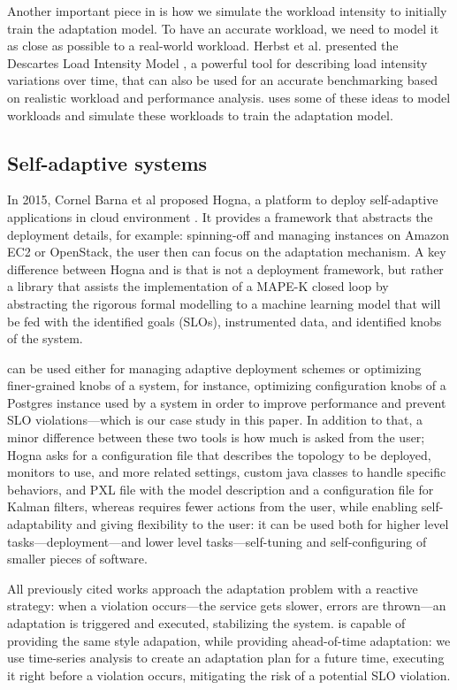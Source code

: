 Another important piece in \projectname{} is how we simulate the workload intensity to initially train the adaptation model. To have an accurate workload, we need to model it as close as possible to a real-world workload. Herbst et al. presented the Descartes Load Intensity Model \cite{kistowski_modeling_2017}, a powerful tool for describing load intensity variations over time, that can also be used for an accurate benchmarking based on realistic workload and performance analysis. \projectname{} uses some of these ideas to model workloads and simulate these workloads to train the adaptation model.

\subsection{Self-adaptive systems}

In 2015, Cornel Barna et al proposed Hogna, a platform to deploy self-adaptive applications in cloud environment \cite{barna_hogna:_2015}. It provides a framework that abstracts the deployment details, for example: spinning-off and managing instances on Amazon EC2 or OpenStack, the user then can focus on the adaptation mechanism. A key difference between Hogna and \projectname{} is that \projectname{} is not a deployment framework, but rather a library that assists the implementation of a MAPE-K closed loop by abstracting the rigorous formal modelling to a machine learning model that will be fed with the identified goals (SLOs), instrumented data, and identified knobs of the system.

\projectname{} can be used either for managing adaptive deployment schemes or optimizing finer-grained knobs of a system, for instance, optimizing configuration knobs of a Postgres instance used by a system in order to improve performance and prevent SLO violations---which is our case study in this paper. In addition to that, a minor difference between these two tools is how much is asked from the user; Hogna asks for a configuration file that describes the topology to be deployed, monitors to use, and more related settings, custom java classes to handle specific behaviors, and PXL file with the model description and a configuration file for Kalman filters, whereas \projectname{} requires fewer actions from the user, while enabling self-adaptability and giving flexibility to the user: it can be used both for higher level tasks---deployment---and lower level tasks---self-tuning and self-configuring of smaller pieces of software.

All previously cited works approach the adaptation problem with a reactive strategy: when a violation occurs---the service gets slower, errors are thrown---an adaptation is triggered and executed, stabilizing the system. \projectname{} is capable of providing the same style adapation, while providing ahead-of-time adaptation: we use time-series analysis to create an adaptation plan for a future time, executing it right before a violation occurs, mitigating the risk of a potential SLO violation. 

